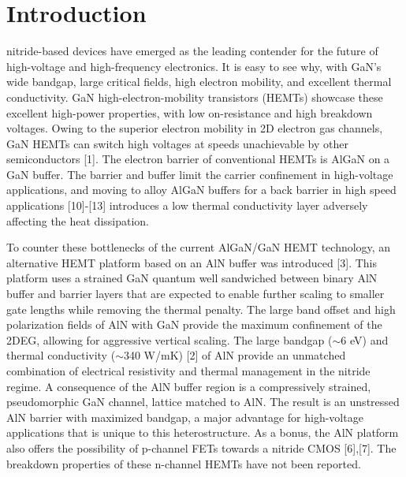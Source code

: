 \documentclass[journal]{IEEEtran}
\begin{document}
%
\IEEEpeerreviewmaketitle
\section{Introduction}
 nitride-based devices have emerged as the leading contender for the future of high-voltage and high-frequency electronics. It is easy to see why, with GaN's wide bandgap, large critical fields, high electron mobility, and excellent thermal conductivity. GaN high-electron-mobility transistors (HEMTs) showcase these excellent high-power properties, with low on-resistance and high breakdown voltages. Owing to the superior electron mobility in 2D electron gas channels, GaN HEMTs can switch high voltages at speeds unachievable by other semiconductors [1]. The electron barrier of conventional HEMTs is AlGaN on a GaN buffer. The barrier and buffer limit the carrier confinement in high-voltage applications, and moving to alloy AlGaN buffers for a back barrier in high speed applications [10]-[13] introduces a low thermal conductivity layer adversely affecting the heat dissipation.

To counter these bottlenecks of the current AlGaN/GaN HEMT technology, an alternative HEMT platform based on an AlN buffer was introduced [3]. This platform uses a strained GaN quantum well sandwiched between binary AlN buffer and barrier layers that are expected to enable further scaling to smaller gate lengths while removing the thermal penalty. The large band offset and high polarization fields of AlN with GaN provide the maximum confinement of the 2DEG, allowing for aggressive vertical scaling. The large bandgap ($\sim$6 eV) and thermal conductivity ($\sim$340 W/mK) [2] of AlN provide an unmatched combination of electrical resistivity and thermal management in the nitride regime. A consequence of the AlN buffer region is a compressively strained, pseudomorphic GaN channel, lattice matched to AlN. The result is an unstressed AlN barrier with maximized bandgap, a major advantage for high-voltage applications that is unique to this heterostructure. As a bonus, the AlN platform also offers the possibility of p-channel FETs towards a nitride CMOS [6],[7].  The breakdown properties of these n-channel HEMTs have not been reported.
\end{document}
